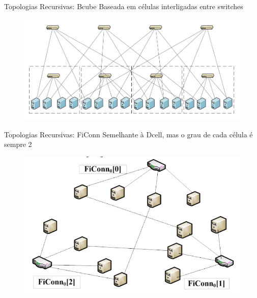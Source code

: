 \documentclass[aspectratio=169]{beamer}
\begin{document}
		\begin{frame} {Topologias Recursivas: Bcube}
			Baseada em células interligadas entre switches
			\begin{figure}[ht]    
				\includegraphics[scale=0.3]{imagens/bcube.png}
				\label{fig:sample_figure}
			\end{figure}
		\end{frame}

		\begin{frame} {Topologias Recursivas: FiConn}
			Semelhante à Dcell, mas o grau de cada célula é sempre 2
			\begin{figure}[ht]    
				\includegraphics[scale=0.3]{imagens/ficonn.png}
				\label{fig:sample_figure}
			\end{figure}
		\end{frame}
\end{document}
